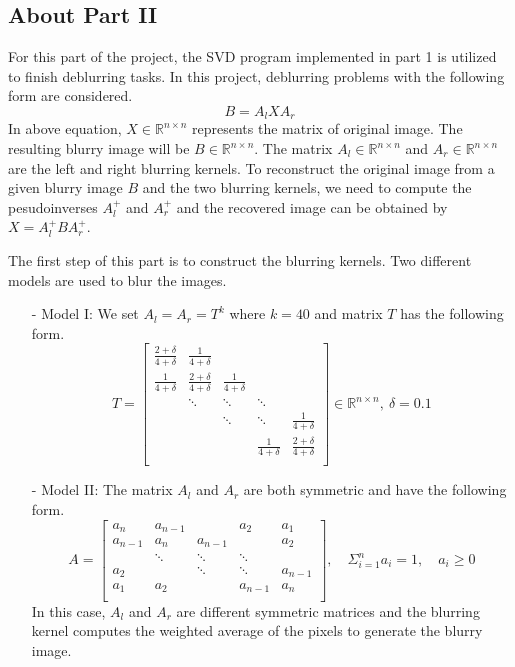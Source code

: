 \subsection{About Part II}
For this part of the project, the SVD program implemented in part 1 is utilized to finish deblurring tasks. In this project, deblurring problems with the following form are considered.
\begin{equation}\tag{3.1}
    B = A_lXA_r
\end{equation}
In above equation, $X \in \mathbb{R}^{n \times n}$ represents the matrix of original image. The resulting blurry image will be $B \in \mathbb{R}^{n \times n}$. The matrix $A_l \in \mathbb{R}^{n \times n}$ and $A_r \in \mathbb{R}^{n \times n}$ are the left and right blurring kernels. To reconstruct the original image from a given blurry image $B$ and the two blurring kernels, we need to compute the pesudoinverses $A_l^+$ and $A_r^+$ and the recovered image can be obtained by $X = A_l^+ B A_r^+$.

The first step of this part is to construct the blurring kernels. Two different models are used to blur the images. 
\begin{enumerate}
\item[-] Model I: We set $A_l = A_r = T^k$ where $k = 40$ and matrix $T$ has the following form.
\begin{equation}\tag{3.2}
    T = \left[\begin{matrix}
        \frac{2 + \delta}{4 + \delta} & \frac{1}{4 + \delta} & & & \\
        \frac{1}{4 + \delta} & \frac{2 + \delta}{4 + \delta} & \frac{1}{4 + \delta} & & \\
        & \ddots  & \ddots & \ddots &  \\
        & & \ddots & \ddots & \frac{1}{4 + \delta} \\
        & & & \frac{1}{4 + \delta} & \frac{2 + \delta}{4 + \delta} \\
    \end{matrix}\right] \in \mathbb{R}^{n \times n}, \ \delta = 0.1
\end{equation}
\item[-] Model II: The matrix $A_l$ and $A_r$ are both symmetric and have the following form. 
\begin{equation}\tag{3.3}
    A = \left[\begin{matrix}
        a_n & a_{n - 1} & & a_2 & a_1 \\
        a_{n - 1} & a_n & a_{n - 1} & & a_2 \\
        & \ddots & \ddots & \ddots & \\
        a_2 & & \ddots & \ddots & a_{n - 1} \\
        a_1 & a_2 & & a_{n - 1} & a_n \\
    \end{matrix}\right], \quad \Sigma_{i = 1}^{n} a_i = 1, \quad a_i \geq 0
\end{equation}
In this case, $A_l$ and $A_r$ are different symmetric matrices and the blurring kernel computes the weighted average of the pixels to generate the blurry image. 
\end{enumerate}

